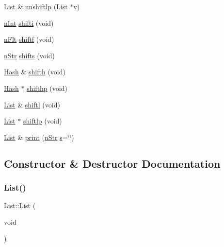 \begin{DoxyCompactItemize}
\item 
\mbox{\hyperlink{classList}{List}} \& \mbox{\hyperlink{classList_a827ad090e891779171defddcdad70d26}{unshiftlp}} (\mbox{\hyperlink{classList}{List}} $\ast$v)
\item 
\mbox{\hyperlink{Node_8h_a17693eab3c96e5b590641f884a5a6ff1}{n\+Int}} \mbox{\hyperlink{classList_aeadbaeee205d723977f1081eb5f2ead2}{shifti}} (void)
\item 
\mbox{\hyperlink{Node_8h_aa7fdace1cf021510d341a4ce92e2223a}{n\+Flt}} \mbox{\hyperlink{classList_ab7d2d8264e5edc471c25e2fa3c8a945a}{shiftf}} (void)
\item 
\mbox{\hyperlink{Node_8h_a0d7591b97fcccd83c3c2ce469c8bc25c}{n\+Str}} \mbox{\hyperlink{classList_afd245b0616bfb8dc6a717ebfdaeba3d1}{shifts}} (void)
\item 
\mbox{\hyperlink{classHash}{Hash}} \& \mbox{\hyperlink{classList_a10d110c7ecd939d86d98483d862a6961}{shifth}} (void)
\item 
\mbox{\hyperlink{classHash}{Hash}} $\ast$ \mbox{\hyperlink{classList_a11387e4990f90b9194dff898267a9ccf}{shifthp}} (void)
\item 
\mbox{\hyperlink{classList}{List}} \& \mbox{\hyperlink{classList_a6c51ffdbe8f270725bc4194e6df89f8e}{shiftl}} (void)
\item 
\mbox{\hyperlink{classList}{List}} $\ast$ \mbox{\hyperlink{classList_a8f30a4b1d773aad5827ba9cc4d18cb21}{shiftlp}} (void)
\item 
\mbox{\hyperlink{classList}{List}} \& \mbox{\hyperlink{classList_af5cb9bb8059366f93abcb0f27e8e8ee7}{print}} (\mbox{\hyperlink{Node_8h_a0d7591b97fcccd83c3c2ce469c8bc25c}{n\+Str}} \mbox{\hyperlink{classList_a4e0ac152caad60fba66fdca9c5fe6dd1}{s}}=\char`\"{}\char`\"{})
\end{DoxyCompactItemize}


\subsection{Constructor \& Destructor Documentation}
\mbox{\label{classList_a30ca8f76a69a1af031025aedcbae29d0}} 
\subsubsection{\texorpdfstring{List()}{List()}}
{\footnotesize\ttfamily List\+::\+List (\begin{DoxyParamCaption}\item[{void}]{ }\end{DoxyParamCaption})}

